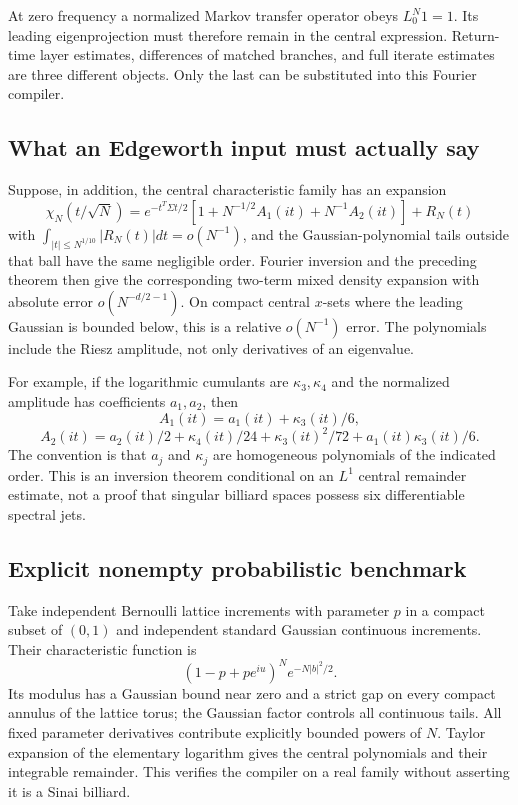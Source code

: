 At zero frequency a normalized Markov transfer operator obeys $L_0^N1=1$. Its leading eigenprojection must therefore remain in the central expression. Return-time layer estimates, differences of matched branches, and full iterate estimates are three different objects. Only the last can be substituted into this Fourier compiler.

\subsection{What an Edgeworth input must actually say}
Suppose, in addition, the central characteristic family has an expansion
\[
 \chi_N(t/\sqrt N)=e^{-t^T\Sigma t/2}
 [1+N^{-1/2}A_1(it)+N^{-1}A_2(it)]+R_N(t)
\]
with $\int_{|t|\le N^{1/10}}|R_N(t)|dt=o(N^{-1})$, and the Gaussian-polynomial tails outside that ball have the same negligible order. Fourier inversion and the preceding theorem then give the corresponding two-term mixed density expansion with absolute error $o(N^{-d/2-1})$. On compact central $x$-sets where the leading Gaussian is bounded below, this is a relative $o(N^{-1})$ error. The polynomials include the Riesz amplitude, not only derivatives of an eigenvalue.

For example, if the logarithmic cumulants are $\kappa_3,\kappa_4$ and the normalized amplitude has coefficients $a_1,a_2$, then
\[
 A_1(it)=a_1(it)+\kappa_3(it)/6,
\]
\[
 A_2(it)=a_2(it)/2+\kappa_4(it)/24+
          \kappa_3(it)^2/72+a_1(it)\kappa_3(it)/6.
\]
The convention is that $a_j$ and $\kappa_j$ are homogeneous polynomials of the indicated order. This is an inversion theorem conditional on an $L^1$ central remainder estimate, not a proof that singular billiard spaces possess six differentiable spectral jets.

\subsection{Explicit nonempty probabilistic benchmark}
Take independent Bernoulli lattice increments with parameter $p$ in a compact subset of $(0,1)$ and independent standard Gaussian continuous increments. Their characteristic function is
\[
 (1-p+pe^{iu})^N e^{-N|b|^2/2}.
\]
Its modulus has a Gaussian bound near zero and a strict gap on every compact annulus of the lattice torus; the Gaussian factor controls all continuous tails. All fixed parameter derivatives contribute explicitly bounded powers of $N$. Taylor expansion of the elementary logarithm gives the central polynomials and their integrable remainder. This verifies the compiler on a real family without asserting it is a Sinai billiard.

